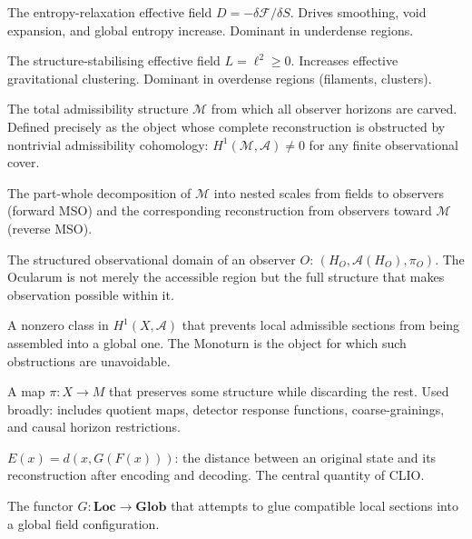 \begin{description}[leftmargin=2.5cm, style=nextline]
\item[Lamphrodyne]
  The entropy-relaxation effective field
  $D = -\delta\mathcal{F}/\delta S$.
  Drives smoothing, void expansion, and global entropy increase.
  Dominant in underdense regions.

\item[Lamphron]
  The structure-stabilising effective field $L = \ell^2 \geq 0$.
  Increases effective gravitational clustering.
  Dominant in overdense regions (filaments, clusters).

\item[Monoturn]
  The total admissibility structure $\mathcal{M}$ from which all
  observer horizons are carved.
  Defined precisely as the object whose complete reconstruction
  is obstructed by nontrivial admissibility cohomology:
  $H^1(\mathcal{M}, \mathcal{A}) \neq 0$ for any finite
  observational cover.

\item[Mereological Space Ontology (MSO)]
  The part-whole decomposition of $\mathcal{M}$ into nested
  scales from fields to observers (forward MSO) and the
  corresponding reconstruction from observers toward
  $\mathcal{M}$ (reverse MSO).

\item[Ocularum]
  The structured observational domain of an observer $O$:
  $(H_O, \mathcal{A}(H_O), \pi_O)$.
  The Ocularum is not merely the accessible region but the
  full structure that makes observation possible within it.

\item[Obstruction]
  A nonzero class in $H^1(X, \mathcal{A})$ that prevents local
  admissible sections from being assembled into a global one.
  The Monoturn is the object for which such obstructions are
  unavoidable.

\item[Projection]
  A map $\pi : X \to M$ that preserves some structure while
  discarding the rest.
  Used broadly: includes quotient maps, detector response
  functions, coarse-grainings, and causal horizon restrictions.

\item[Reconstruction error]
  $E(x) = d(x, G(F(x)))$: the distance between an original
  state and its reconstruction after encoding and decoding.
  The central quantity of CLIO.

\item[Reconstruction functor]
  The functor $G : \mathbf{Loc} \to \mathbf{Glob}$ that
  attempts to glue compatible local sections into a global
  field configuration.


\end{description}
